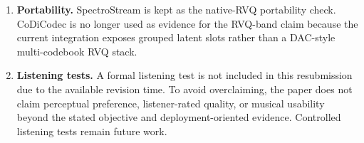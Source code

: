 \documentclass[twoside,a4paper]{article}
\begin{document}
\begin{enumerate}
    \item \textbf{Portability.} SpectroStream is kept as the native-RVQ portability check. CoDiCodec is no longer used as evidence for the RVQ-band claim because the current integration exposes grouped latent slots rather than a DAC-style multi-codebook RVQ stack.
    \item \textbf{Listening tests.} A formal listening test is not included in this resubmission due to the available revision time. To avoid overclaiming, the paper does not claim perceptual preference, listener-rated quality, or musical usability beyond the stated objective and deployment-oriented evidence. Controlled listening tests remain future work.
\end{enumerate}
\end{document}
